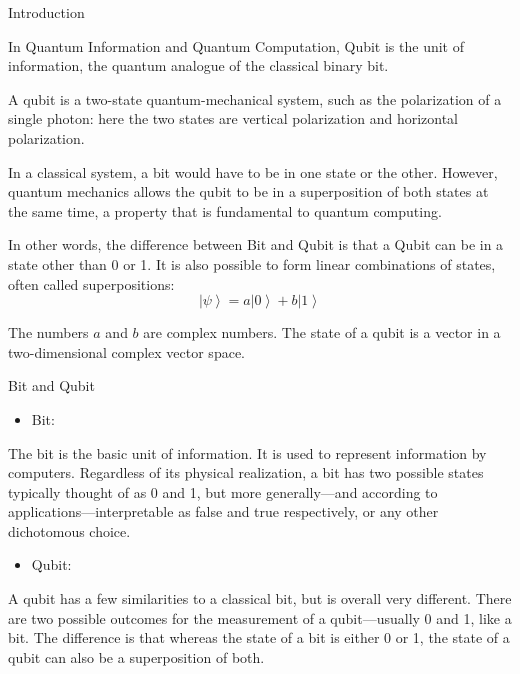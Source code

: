 \documentclass[UTF8,beamer,serif,ctexart]{beamer}
\begin{document}
\begin{frame}{Introduction}{}
	\par In Quantum Information and Quantum Computation, Qubit is the unit of information, the quantum analogue of the classical binary bit. 
	\par A qubit is a two-state quantum-mechanical system, such as the polarization of a single photon: here the two states are vertical polarization and horizontal polarization.
	\par In a classical system, a bit would have to be in one state or the other. However, quantum mechanics allows the qubit to be in a superposition of both states at the same time, a property that is fundamental to quantum computing.
	\par In other words, the difference between Bit and Qubit is that a Qubit can be in a state other than 0 or 1. It is also possible to form linear combinations of states, often called superpositions:
	\begin{equation}
		\left| \psi \right\rangle = a\left| 0 \right\rangle+b\left| 1 \right\rangle
	\end {equation}
	\par \setlength{\parindent}{1em} The numbers $a$ and $b$ are complex numbers. The state of a qubit is a vector in a two-dimensional complex vector space.
\end{frame}

\begin{frame}{Bit and Qubit}{}
	\begin{itemize}  
	\item Bit:
	\end{itemize} 
	\par The bit is the basic unit of information. It is used to represent information by computers. Regardless of its physical realization, a bit has two possible states typically thought of as 0 and 1, but more generally—and according to applications—interpretable as false and true respectively, or any other dichotomous choice. 
	\begin{itemize}  
	\item Qubit:
	\end{itemize} 
	\par A qubit has a few similarities to a classical bit, but is overall very different. There are two possible outcomes for the measurement of a qubit—usually 0 and 1, like a bit. The difference is that whereas the state of a bit is either 0 or 1, the state of a qubit can also be a superposition of both.
\end{frame}
\end{document}
